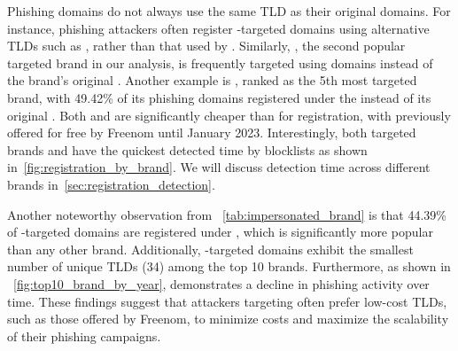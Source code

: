 \label{sec:using_diff_tld}
Phishing domains do not always use the same TLD as their original domains. 
For instance, 
phishing attackers often register -targeted domains using alternative TLDs such as , rather than  that used by . 
Similarly, , the second popular targeted brand in our analysis, is frequently targeted using  domains instead of the brand’s original . 
Another example is , ranked as the 5th most targeted brand, with 49.42\% of its phishing domains registered under the  instead of its original . 
Both  and  are significantly cheaper than  for registration, with  previously offered for free by Freenom until January 2023. 
Interestingly, both targeted brands  and  have the quickest detected time by blocklists as shown in~\autoref{fig:registration_by_brand}.
We will discuss detection time across different brands in~\autoref{sec:registration_detection}.

Another noteworthy observation from ~\autoref{tab:impersonated_brand} is that 44.39\% of -targeted domains are registered under , which is significantly more popular than any other brand. Additionally, -targeted domains exhibit the smallest number of unique TLDs (34) among the top 10 brands.
Furthermore, as shown in ~\autoref{fig:top10_brand_by_year},  demonstrates a decline in phishing activity over time. 
These findings suggest that attackers targeting  often prefer low-cost TLDs, such as those offered by Freenom, to minimize costs and maximize the scalability of their phishing campaigns.




